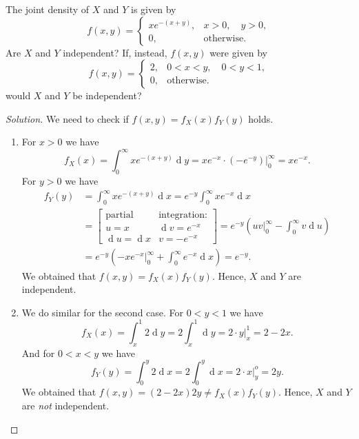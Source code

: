 \documentclass{article}[12pt]
\newenvironment{solution}
  {\renewcommand\qedsymbol{$\blacksquare$}\begin{proof}[Solution]}
  {\end{proof}}
\newenvironment{problem}[1]
  {\renewcommand\theinnercustomprblm{#1}\innercustomprblm}
  {\endinnercustomprblm}
\DeclareMathOperator{\dif}{d}
\begin{document}
\begin{problem}{6.20}\normalfont
The joint density of $X$ and $Y$ is given by
\begin{equation*}
    f(x, y) = 
    \begin{cases}
        xe^{-(x+y)}, &x > 0,\quad y > 0,
        \\
        0, &\text{otherwise}.
    \end{cases}
\end{equation*}
Are $X$ and $Y$ independent? 
If, instead, $f(x, y)$ were given by
\begin{equation*}
    f(x, y) = 
    \begin{cases}
        2, &0 < x < y,\quad 0 < y < 1,
        \\
        0, &\text{otherwise}.
    \end{cases}
\end{equation*}
would $X$ and $Y$ be independent?
\end{problem}
\begin{solution}
We need to check if $f(x, y) = f_{X}(x)f_{Y}(y)$ holds.
\begin{enumerate}
    \item For $x > 0$ we have
    \begin{equation*}
        f_{X}(x) = \int_{0}^{\infty}xe^{-(x+y)}\dif y = xe^{-x}\cdot\left(-e^{-y}\right)\Big|_{0}^{\infty} = xe^{-x}.
    \end{equation*}
    For $y > 0$ we have
    \begin{align*}
        f_{Y}(y) &= \int_{0}^{\infty}xe^{-(x+y)}\dif x = e^{-y}\int_{0}^{\infty}xe^{-x}\dif x
        \\
        &= \begin{bmatrix} \text{partial} & \text{integration:} \\ u = x & \dif v = e^{-x} \\ \dif u = \dif x & v = -e^{-x}\end{bmatrix} = e^{-y}\left(uv\Big|_{0}^{\infty} - \int_{0}^{\infty}v\dif u\right)
        \\
        &= e^{-y}\left(-xe^{-x}\Big|_{0}^{\infty} + \int_{0}^{\infty}e^{-x}\dif x\right) = e^{-y}.
    \end{align*}
    We obtained that $f(x, y) = f_{X}(x)f_{Y}(y)$.
    Hence, $X$ and $Y$ are independent.
    \item We do similar for the second case.
    For $0 < y < 1$ we have
    \begin{equation*}
        f_{X}(x) = \int_{x}^{1}2\dif y = 2\int_{x}^{1}\dif y = 2\cdot y\Big|_{x}^{1} = 2 - 2x.
    \end{equation*}
    And for $0 < x < y$ we have
    \begin{equation*}
        f_{Y}(y) = \int_{0}^{y}2\dif x = 2\int_{0}^{y}\dif x = 2\cdot x\Big|_{y}^{o} = 2y.
    \end{equation*}
    We obtained that $f(x, y) = (2 -2x)2y \neq f_{X}(x)f_{Y}(y)$.
    Hence, $X$ and $Y$ are \textit{not} independent.
\end{enumerate}
\end{solution}
\end{document}
